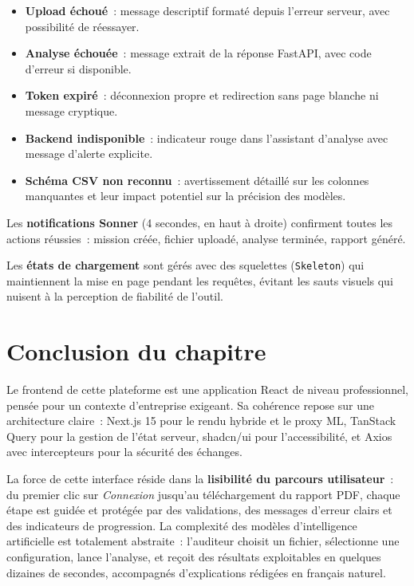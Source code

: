 \begin{itemize}[leftmargin=1.5em]
  \item \textbf{Upload échoué}~: message descriptif formaté depuis l'erreur serveur, avec possibilité de réessayer.
  \item \textbf{Analyse échouée}~: message extrait de la réponse FastAPI, avec code d'erreur si disponible.
  \item \textbf{Token expiré}~: déconnexion propre et redirection sans page blanche ni message cryptique.
  \item \textbf{Backend indisponible}~: indicateur rouge dans l'assistant d'analyse avec message d'alerte explicite.
  \item \textbf{Schéma CSV non reconnu}~: avertissement détaillé sur les colonnes manquantes et leur impact potentiel sur la précision des modèles.
\end{itemize}

Les \textbf{notifications Sonner} (4 secondes, en haut à droite) confirment toutes les actions réussies~: mission créée, fichier uploadé, analyse terminée, rapport généré.

Les \textbf{états de chargement} sont gérés avec des squelettes (\texttt{Skeleton}) qui maintiennent la mise en page pendant les requêtes, évitant les sauts visuels qui nuisent à la perception de fiabilité de l'outil.

\section*{Conclusion du chapitre}

Le frontend de cette plateforme est une application React de niveau professionnel, pensée pour un contexte d'entreprise exigeant. Sa cohérence repose sur une architecture claire~: Next.js 15 pour le rendu hybride et le proxy ML, TanStack Query pour la gestion de l'état serveur, shadcn/ui pour l'accessibilité, et Axios avec intercepteurs pour la sécurité des échanges.

La force de cette interface réside dans la \textbf{lisibilité du parcours utilisateur}~: du premier clic sur \textit{Connexion} jusqu'au téléchargement du rapport PDF, chaque étape est guidée et protégée par des validations, des messages d'erreur clairs et des indicateurs de progression. La complexité des modèles d'intelligence artificielle est totalement abstraite~: l'auditeur choisit un fichier, sélectionne une configuration, lance l'analyse, et reçoit des résultats exploitables en quelques dizaines de secondes, accompagnés d'explications rédigées en français naturel.
